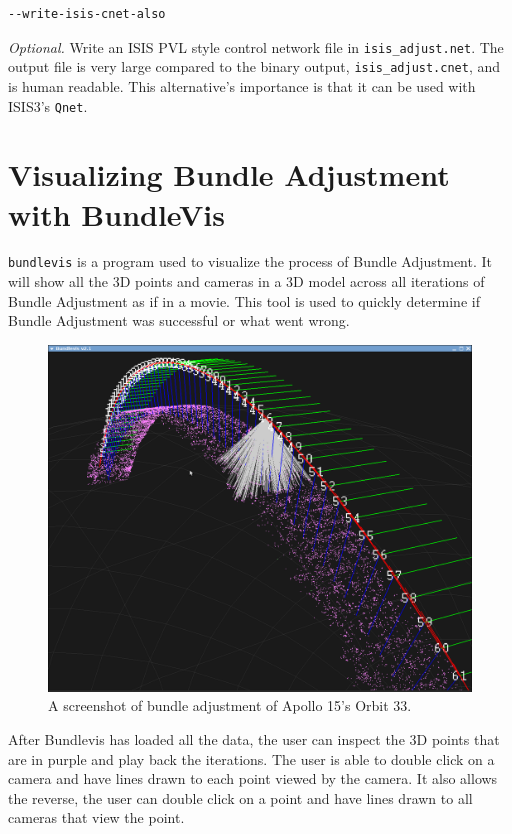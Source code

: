 \begin{verbatim}
--write-isis-cnet-also
\end{verbatim}

\emph{Optional.} Write an ISIS PVL style control network file in
\verb=isis_adjust.net=. The output file is very large compared to the
binary output, \verb=isis_adjust.cnet=, and is human readable. This
alternative's importance is that it can be used with ISIS3's
\texttt{Qnet}.

\section{Visualizing Bundle Adjustment with BundleVis}

\texttt{bundlevis} is a program used to visualize the process of
Bundle Adjustment. It will show all the 3D points and cameras in a 3D
model across all iterations of Bundle Adjustment as if in a
movie. This tool is used to quickly determine if Bundle Adjustment was
successful or what went wrong.

\begin{figure}[htp]
  \begin{center}
  \includegraphics[width=5in]{images/bundlevis_apollo.png}
  \end{center}
  \caption{ A screenshot of bundle adjustment of Apollo 15's Orbit 33. }
  \label{fig:bundlevis}
\end{figure}

After Bundlevis has loaded all the data, the user can inspect the 3D
points that are in purple and play back the iterations. The user is
able to double click on a camera and have lines drawn to each point
viewed by the camera. It also allows the reverse, the user can double
click on a point and have lines drawn to all cameras that view the
point.

